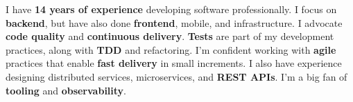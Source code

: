 \documentclass[10pt,a4paper,ragged2e,withhyper]{altacv}
\begin{document}
\begin{paracol}{2}









\switchcolumn

%

%
%
%




I have \textbf{14 years of experience} developing software professionally. I focus on \textbf{backend}, but have also done \textbf{frontend}, mobile, and infrastructure. I advocate \textbf{code quality} and \textbf{continuous delivery}. \textbf{Tests} are part of my development practices, along with \textbf{TDD} and refactoring. I’m confident working with \textbf{agile} practices that enable \textbf{fast delivery} in small increments. I also have experience designing distributed services, microservices, and \textbf{REST APIs}. I'm a big fan of \textbf{tooling} and \textbf{observability}.


\end{paracol}
\end{document}

